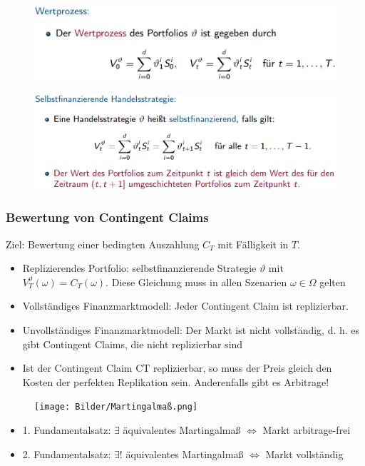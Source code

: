 \documentclass[12pt]{report}
\theoremstyle{dotless}
\theoremstyle{definition}
\begin{document}
\begin{figure}[ht]
	\centering
	\includegraphics[width=0.8 \textwidth]{Bilder/Wertprozess.png}
\end{figure}

\begin{figure}[ht]
	\centering
	\includegraphics[width=0.8 \textwidth]{Bilder/Handelsstrategie.png}
\end{figure}


\subsubsection{Bewertung von Contingent Claims}
Ziel: Bewertung einer bedingten Auszahlung $C_T$ mit Fälligkeit in $T$.
\begin{itemize}
\item Replizierendes Portfolio: selbstfinanzierende Strategie $\vartheta$ mit $V_T^\vartheta (\omega) = C_T(\omega)$. Diese Gleichung muss in allen Szenarien $\omega \in \Omega$ gelten
\item Vollständiges Finanzmarktmodell:
Jeder Contingent Claim ist replizierbar.
\item Unvollständiges Finanzmarktmodell:
Der Markt ist nicht vollständig, d. h. es gibt Contingent Claims, die nicht
replizierbar sind
\item Ist der Contingent Claim CT replizierbar, so muss der Preis gleich den Kosten
der perfekten Replikation sein. Anderenfalls gibt es Arbitrage!

\end{itemize}

\begin{figure}[ht]
	\centering
	\texttt{[image: Bilder/Martingalmaß.png]}
\end{figure}

\begin{itemize}
\item 1. Fundamentalsatz: $\exists$ äquivalentes Martingalmaß $\Leftrightarrow$ Markt arbitrage-frei
\item 2. Fundamentalsatz: $\exists$! äquivalentes Martingalmaß $\Leftrightarrow$ Markt vollständig
\end{itemize}
\end{document}
